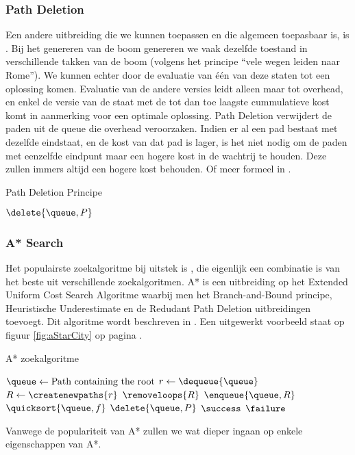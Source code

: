 \subsubsection{Path Deletion}
Een andere uitbreiding die we kunnen toepassen en die algemeen toepasbaar is, is . Bij het genereren van de boom genereren we vaak dezelfde toestand in verschillende takken van de boom (volgens het principe ``vele wegen leiden naar Rome''). We kunnen echter door de evaluatie van \'e\'en van deze staten tot een oplossing komen. Evaluatie van de andere versies leidt alleen maar tot overhead, en enkel de versie van de staat met de tot dan toe laagste cummulatieve kost komt in aanmerking voor een optimale oplossing. Path Deletion verwijdert de paden uit de queue die overhead veroorzaken. Indien er al een pad bestaat met dezelfde eindstaat, en de kost van dat pad is lager, is het niet nodig om de paden met eenzelfde eindpunt maar een hogere kost in de wachtrij te houden. Deze zullen immers altijd een hogere kost behouden. Of meer formeel in .
\begin{algorithm}[htb]
\caption{Path Deletion Principe}
\label{alg:pathDeletion}
\begin{algorithmic}[1]
\STATE $\delete{\queue,P}$
\ENDIF
\end{algorithmic}
\end{algorithm}
\subsubsection{A* Search}
Het populairste zoekalgoritme bij uitstek is , die eigenlijk een combinatie is van het beste uit verschillende zoekalgoritmen. A* is een uitbreiding op het Extended Uniform Cost Search Algoritme waarbij men het Branch-and-Bound principe, Heuristische Underestimate en de Redudant Path Deletion uitbreidingen toevoegt. Dit algoritme wordt beschreven in . Een uitgewerkt voorbeeld staat op figuur \ref{fig:aStarCity} op pagina \pageref{fig:aStarCity}.
\begin{algorithm}[htb]
\caption{A* zoekalgoritme}
\label{alg:aStar}
\begin{algorithmic}[1]
\STATE $\queue\leftarrow\mbox{Path containing the root}$
\WHILE{$\notempty{\queue}\wedge\neg\goalreached{\queue\left[0\right]}$}
\STATE $r\leftarrow\dequeue{\queue}$
\STATE $R\leftarrow\createnewpaths{r}$
\STATE $\removeloops{R}$
\STATE $\enqueue{\queue,R}$
\STATE $\quicksort{\queue,f}$
\STATE{}
\STATE $\delete{\queue,P}$
\ENDIF
\ENDFOR
\ENDWHILE
\IF{$\goalreached{\queue\left[0\right]}$}
\RETURN $\success$
\ELSE
\RETURN $\failure$
\ENDIF
\end{algorithmic}
\end{algorithm}
Vanwege de populariteit van A* zullen we wat dieper ingaan op enkele eigenschappen van A*.
